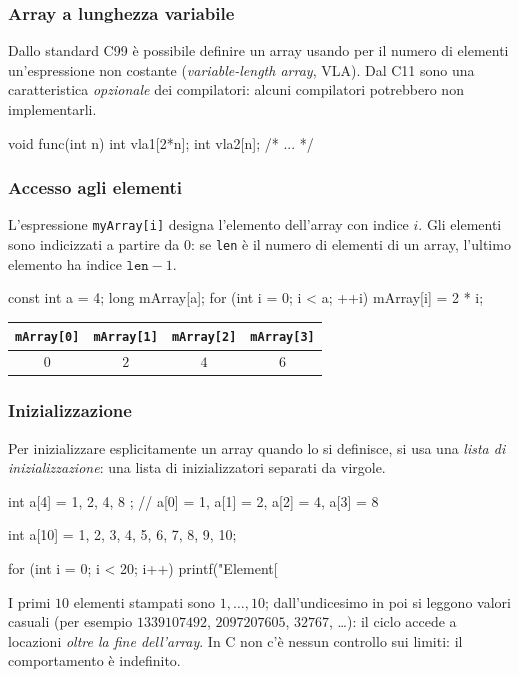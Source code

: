 \documentclass[11pt,a4paper]{article}
\begin{document}
\subsubsection{Array a lunghezza variabile}

Dallo standard C99 è possibile definire un array usando per il numero di elementi un'espressione non costante (\emph{variable-length array}, VLA). Dal C11 sono una caratteristica \emph{opzionale} dei compilatori: alcuni compilatori potrebbero non implementarli.
\begin{codice}
void func(int n)
{
    int vla1[2*n];
    int vla2[n];
    /* ... */
}
\end{codice}

\subsubsection{Accesso agli elementi}

L'espressione \lstinline|myArray[i]| designa l'elemento dell'array con indice $i$. Gli elementi sono indicizzati a partire da $0$: se \lstinline|len| è il numero di elementi di un array, l'ultimo elemento ha indice $\texttt{len}-1$.
\begin{codice}
const int a = 4;
long mArray[a];
for (int i = 0; i < a; ++i)
    mArray[i] = 2 * i;
\end{codice}
\begin{center}
\begin{tabular}{|c|c|c|c|}
\hline
\lstinline|mArray[0]| & \lstinline|mArray[1]| & \lstinline|mArray[2]| & \lstinline|mArray[3]|\\
\hline
$0$ & $2$ & $4$ & $6$\\
\hline
\end{tabular}
\end{center}

\subsubsection{Inizializzazione}

Per inizializzare esplicitamente un array quando lo si definisce, si usa una \emph{lista di inizializzazione}: una lista di inizializzatori separati da virgole.
\begin{codice}
int a[4] = { 1, 2, 4, 8 };   // a[0] = 1, a[1] = 2, a[2] = 4, a[3] = 8
\end{codice}

\begin{esempio}
\begin{codice}
int a[10] = {1, 2, 3, 4, 5, 6, 7, 8, 9, 10};

for (int i = 0; i < 20; i++) {
    printf("Element[%
}
\end{codice}
I primi $10$ elementi stampati sono $1,\dots,10$; dall'undicesimo in poi si leggono valori casuali (per esempio $1339107492$, $2097207605$, $32767$, \dots): il ciclo accede a locazioni \emph{oltre la fine dell'array}. In C non c'è nessun controllo sui limiti: il comportamento è indefinito.
\end{esempio}
\end{document}

